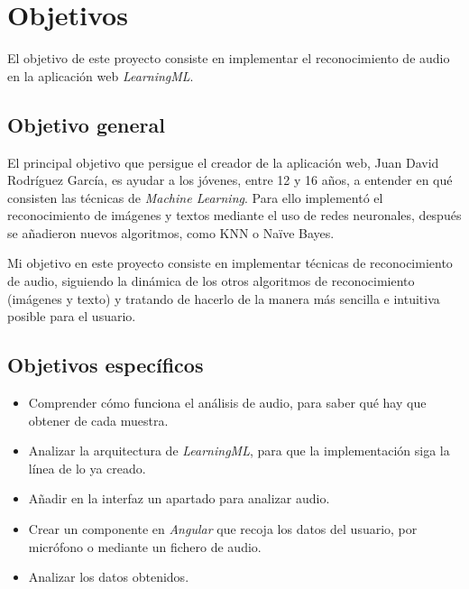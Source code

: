 \documentclass[a4paper, 12pt]{book}
\begin{document}
\cleardoublepage %
\chapter{Objetivos} %
\label{chap:objetivos} %

El objetivo de este proyecto consiste en implementar el reconocimiento de audio en la aplicación web \textit{LearningML}.

\section{Objetivo general} %
\label{sec:objetivo-general} %

El principal objetivo que persigue el creador de la aplicación web, Juan David Rodríguez García, es ayudar a los jóvenes, entre 12 y 16 años, a entender en qué consisten las técnicas de \textit{Machine Learning}. Para ello implementó el reconocimiento de imágenes y textos mediante el uso de redes neuronales, después se añadieron nuevos algoritmos, como KNN o Naïve Bayes.

Mi objetivo en este proyecto consiste en implementar técnicas de reconocimiento de audio, siguiendo la dinámica de los otros algoritmos de reconocimiento (imágenes y texto) y tratando de hacerlo de la manera más sencilla e intuitiva posible para el usuario.

\section{Objetivos específicos}
\label{sec:objetivos-especificos}

\begin{itemize}

  \item Comprender cómo funciona el análisis de audio, para saber qué hay que obtener de cada muestra.
  \item Analizar la arquitectura de \textit{LearningML}, para que la implementación siga la línea de lo ya creado.
  \item Añadir en la interfaz un apartado para analizar audio.
  \item Crear un componente en \textit{Angular} que recoja los datos del usuario, por micrófono o mediante un fichero de audio.
  \item Analizar los datos obtenidos.

\end{itemize}
\end{document}
